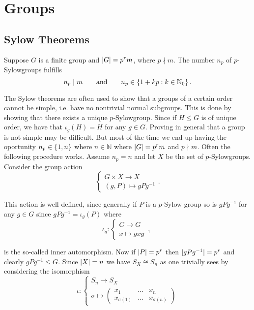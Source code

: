 \section{Groups}

\subsection{Sylow Theorems}

Suppose $G$ is a finite group and $\abs[0]{G} = p^r m$, where $p \nmid m$. The number $n_p$ of $p$-Sylowgroups fulfills 
\begin{equation}
	n_p \mid m \qquad \text{and} \qquad n_p \in \cbr[0]{1 + kp : k \in \mathbb{N}_0}.
\end{equation}

The Sylow theorems are often used to show that a groups of a certain order cannot be simple, i.e. have no nontrivial normal subgroups. This is done by showing that there exists a unique $p$-Sylowgroup. Since if $H \leq G$ is of unique order, we have that $\iota_g(H) = H$ for any $g \in G$. Proving in general that a group is not simple may be difficult. But most of the time we end up having the oportunity $n_p \in \cbr[0]{1,n}$ where $n \in \mathbb{N}$ where $\abs[0]{G} = p^rm$ and $p \nmid m$. Often the following procedure works. Assume $n_p = n$ and let $X$ be the set of $p$-Sylowgroups. Consider the group action
	\begin{equation}
		\begin{cases}
			G \times X \to X\\
			(g,P) \mapsto gPg^{-1}
		\end{cases}.
	\end{equation}

	This action is well defined, since generally if $P$ is a $p$-Sylow group so is $gPg^{-1}$ for any $g \in G$ since $gPg^{-1} = \iota_g(P)$ where 
	\begin{equation}
		\iota_g:\begin{cases}
			G \to G\\
			x \mapsto gxg^{-1}
		\end{cases}
	\end{equation}
	
	\noindent is the so-called inner automorphism. Now if $\abs[0]{P} = p^r$ then $\abs[0]{gPg^{-1}} = p^r$ and clearly $gPg^{-1} \leq G$. Since $\abs[0]{X} = n$ we have $S_X \cong S_n$ as one trivially sees by considering the isomorphism 
	\begin{equation}
		\iota:\begin{cases} S_n \to S_X\\
			\sigma \mapsto \begin{pmatrix}x_1 & \dots & x_n\\
				x_{\sigma(1)} & \dots & x_{\sigma(n)}
			\end{pmatrix}
		\end{cases}
	\end{equation}

